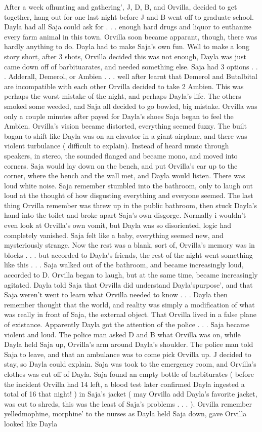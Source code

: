 \documentclass[12pt]{book}
\begin{document}
After a week ofhunting and gathering', J, D, B, and Orvilla, decided to get together, hang out for one last night before J and B went off to graduate school. Dayla had all Saja could ask for . . .  enough hard drugs and liquor to euthanize every farm animal in this town. Orvilla soon became apparant, though, there was hardly anything to do. Dayla had to make Saja's own fun. Well to make a long story short, after 3 shots, Orvilla decided this was not enough, Dayla was just came down off of barbituarates, and needed something else. Saja had 3 options . . .  Adderall, Demerol, or Ambien . . .  well after learnt that Demerol and Butalbital are incompatible with each other Orvilla decided to take 2 Ambien. This was perhaps the worst mistake of the night, and perhaps Dayla's life. The others smoked some weeded, and Saja all decided to go bowled, big mistake. Orvilla was only a couple minutes after payed for Dayla's shoes Saja began to feel the Ambien. Orvilla's vision became distorted, everything seemed fuzzy. The built bagan to shift like Dayla was on an elavator in a giant airplane, and there was violent turbulance ( difficult to explain). Instead of heard music through speakers, in stereo, the sounded flanged and became mono, and moved into corners. Saja would lay down on the bench, and put Orvilla's ear up to the corner, where the bench and the wall met, and Dayla would listen. There was loud white noise. Saja remember stumbled into the bathroom, only to laugh out loud at the thought of how disgusting everything and everyone seemed. The last thing Orvilla remember was threw up in the public bathroom, then stuck Dayla's hand into the toilet and broke apart Saja's own disgorge. Normally i wouldn't even look at Orvilla's own vomit, but Dayla was so disoriented, logic had completely vanished. Saja felt like a baby, everything seemed new, and mysteriously strange. Now the rest was a blank, sort of, Orvilla's memory was in blocks . . .  but accorded to Dayla's friends, the rest of the night went something like this . . .  Saja walked out of the bathroom, and became increasingly loud, accorded to D. Orvilla began to laugh, but at the same time, became increasingly agitated. Dayla told Saja that Orvilla did understand Dayla'spurpose', and that Saja weren't went to learn what Orvilla needed to know . . .  Dayla then remember thought that the world, and reality was simply a modification of what was really in front of Saja, the external object. That Orvilla lived in a false plane of existance. Apparently Dayla got the attention of the police . . .  Saja became violent and loud. The police man asked D and B what Orvilla was on, while Dayla held Saja up, Orvilla's arm around Dayla's shoulder. The police man told Saja to leave, and that an ambulance was to come pick Orvilla up. J decided to stay, so Dayla could explain. Saja was took to the emergency room, and Orvilla's clothes was cut off of Dayla. Saja found an empty bottle of barbiturates ( before the incident Orvilla had 14 left, a blood test later confirmed Dayla ingested a total of 16 that night! ) in Saja's jacket ( may Orvilla add Dayla's favorite jacket, was cut to shreds, this was the least of Saja's problems . . .  ). Orvilla remember yelledmophine, morphine' to the nurses as Dayla held Saja down, gave Orvilla looked like Dayla 
\end{document}
